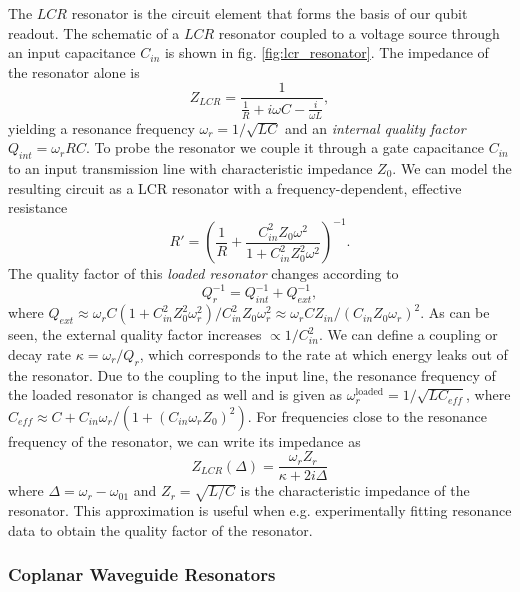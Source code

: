 The $LCR$ resonator is the circuit element that forms the basis of our qubit readout. The schematic of a $LCR$ resonator coupled to a voltage source through an input capacitance $C_{in}$ is  shown in fig. \ref{fig:lcr_resonator}. The impedance of the resonator alone is
%
\begin{equation}
Z_{LCR} = \frac{1}{\frac{1}{R}+i\omega C - \frac{i}{\omega L}},
\end{equation}
%
yielding a resonance frequency $\omega_r = 1/\sqrt{LC}$ and an {\it internal quality factor} $Q_{int} = \omega_r R C$. To probe the resonator we couple it through a gate capacitance $C_{in}$ to an input transmission line with characteristic impedance $Z_0$. We can model the resulting circuit as a LCR resonator with a frequency-dependent, effective resistance
%
\begin{equation}
R' = \left(\frac{1}{R}+\frac{C_{in}^2 Z_0 \omega^2}{1+C_{in}^2 Z_0^2 \omega^2}\right)^{-1}.
\end{equation}
%
The quality factor of this {\it loaded resonator} changes according to 
%
\begin{equation}
Q_r^{-1} = Q^{-1}_{int}+Q^{-1}_{ext},
\end{equation}
%
where $Q_{ext} \approx \omega_r C (1+C_{in}^2Z_0^2\omega_r^2)/C_{in}^2 Z_0\omega_r^2 \approx \omega_r C Z_{in}/(C_{in}Z_0 \omega_r)^2$. As can be seen, the external quality factor increases $\propto 1 / C_{in}^2$. We can define a coupling or decay rate $\kappa=\omega_r/Q_r$, which corresponds to the rate at which energy leaks out of the resonator. Due to the coupling to the input line, the resonance frequency of the loaded resonator is changed as well and is given as $\omega_{r}^{\mathrm{loaded}}=1/\sqrt{LC_{eff}}$, where $C_{eff} \approx C+C_{in}\omega_{r}/(1+(C_{in}\omega_r Z_0)^2)$. For frequencies close to the resonance frequency of the resonator, we can write its impedance as
%
\begin{equation}
Z_{LCR}(\Delta) = \frac{\omega_r Z_r}{\kappa+2i\Delta} \label{eq:lcr_lorentzian}
\end{equation}
%
where $\Delta = \omega_r-\omega_{01}$ and $Z_r = \sqrt{L/C}$ is the characteristic impedance of the resonator. This approximation is useful when e.g. experimentally fitting resonance data to obtain the quality factor of the resonator.

\subsubsection{Coplanar Waveguide Resonators}

